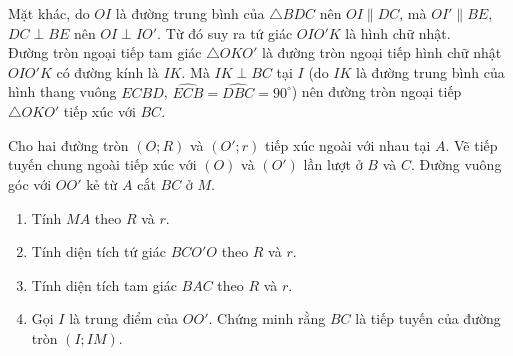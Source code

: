 \begin{vd}
{\begin{enumerate}
Mặt khác, do $OI$ là đường trung bình của $\triangle BDC$ nên $OI\parallel DC$, mà $OI'\parallel BE$, $DC\perp BE$ nên $OI\perp IO'$. Từ đó suy ra tứ giác $OIO'K$ là hình chữ nhật. \\
Đường tròn ngoại tiếp tam giác $\triangle OKO'$ là đường tròn ngoại tiếp hình chữ nhật $OIO'K$ có đường kính là $IK$. Mà $IK\perp BC$ tại $I$ (do $IK$ là đường trung bình của hình thang vuông $ECBD$, $\widehat{ECB}=\widehat{DBC}=90^\circ$) nên đường tròn ngoại tiếp $\triangle OKO'$ tiếp xúc với $BC$.
\end{enumerate}
}
\end{vd}

\begin{vd}
Cho hai đường tròn $(O;R)$ và $(O';r)$ tiếp xúc ngoài với nhau tại $A$. Vẽ tiếp tuyến chung ngoài tiếp xúc với $(O)$ và $(O')$ lần lượt ở $B$ và $C$.  Đường vuông góc với $OO'$ kẻ từ $A$ cắt $BC$ ở $M$.
\begin{enumerate}
\item Tính $MA$ theo $R$ và $r$.
\item Tính diện tích tứ giác $BCO'O$ theo $R$ và $r$.
\item Tính diện tích tam giác $BAC$ theo $R$ và $r$.
\item Gọi $I$ là trung điểm của $OO'$. Chứng minh rằng $BC$ là tiếp tuyến của đường tròn $(I;IM)$.
\end{enumerate}
	\loigiai{

}
\end{vd}
